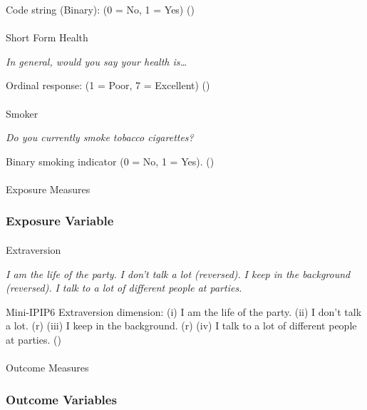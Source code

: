 \documentclass[
  single column]{article}
\makeatletter
\let\oldparagraph\paragraph
\renewcommand{\paragraph}{
    \@ifstar
      \xxxParagraphStar
      \xxxParagraphNoStar
  }
\newcommand{\xxxParagraphStar}[1]{\oldparagraph*{#1}\mbox{}}
\newcommand{\xxxParagraphNoStar}[1]{\oldparagraph{#1}\mbox{}}
\makeatother
\begin{document}
Code string (Binary): (0 = No, 1 = Yes)
()

\paragraph{Short Form Health}\label{short-form-health}

\emph{In general, would you say your health is\ldots{}}

Ordinal response: (1 = Poor, 7 = Excellent)
()

\paragraph{Smoker}\label{smoker}

\emph{Do you currently smoke tobacco cigarettes?}

Binary smoking indicator (0 = No, 1 = Yes).
()

\paragraph{Exposure Measures}\label{exposure-measures}

\subsubsection{Exposure Variable}\label{exposure-variable}

\paragraph{Extraversion}\label{extraversion}

\emph{I am the life of the party.} \emph{I don't talk a lot (reversed).}
\emph{I keep in the background (reversed).} \emph{I talk to a lot of
different people at parties.}

Mini-IPIP6 Extraversion dimension: (i) I am the life of the party. (ii)
I don't talk a lot. (r) (iii) I keep in the background. (r) (iv) I talk
to a lot of different people at parties.
()

\paragraph{Outcome Measures}\label{outcome-measures}

\subsubsection{Outcome Variables}\label{outcome-variables}
\end{document}
